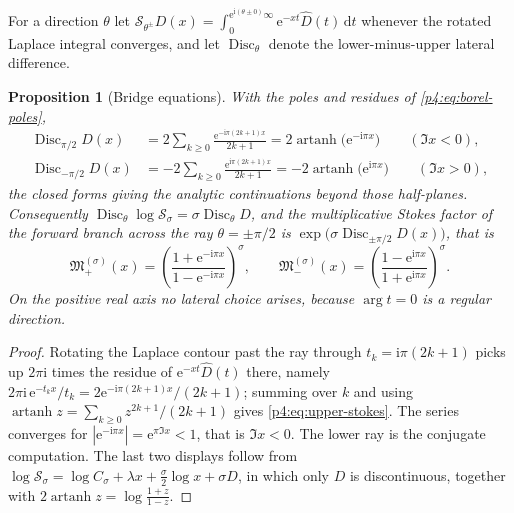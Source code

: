 \documentclass[11pt,a4paper,oneside]{book}
\theoremstyle{plain}
\newtheorem{proposition}[theorem]{Proposition}
\theoremstyle{definition}
\theoremstyle{remark}
\newcommand{\e}{\mathrm{e}}
\newcommand{\ii}{\mathrm{i}}
\newcommand{\dd}{\mathrm{d}}
\begin{document}
For a direction $\theta$ let
$\mathcal S_{\theta^{\pm}}D(x)
 =\int_0^{\e^{\ii(\theta\pm0)}\infty}\e^{-xt}\widehat D(t)\,\dd t$
whenever the rotated Laplace integral converges, and let
$\operatorname{Disc}_\theta$ denote the lower-minus-upper lateral difference.

\begin{proposition}[Bridge equations]
\label{p4:prop:stokes}
With the poles and residues of \cref{p4:eq:borel-poles},
\begin{align}
  \operatorname{Disc}_{\pi/2}D(x)
   &=2\sum_{k\ge0}\frac{\e^{-\ii\pi(2k+1)x}}{2k+1}
   =2\operatorname{artanh}\bigl(\e^{-\ii\pi x}\bigr)
   \qquad(\Im x<0),
  \label{p4:eq:upper-stokes}\\
  \operatorname{Disc}_{-\pi/2}D(x)
   &=-2\sum_{k\ge0}\frac{\e^{\ii\pi(2k+1)x}}{2k+1}
   =-2\operatorname{artanh}\bigl(\e^{\ii\pi x}\bigr)
   \qquad(\Im x>0),
  \label{p4:eq:lower-stokes}
\end{align}
the closed forms giving the analytic continuations beyond those half-planes.
Consequently
$\operatorname{Disc}_\theta\log\mathcal S_\sigma
 =\sigma\operatorname{Disc}_\theta D$, and the multiplicative Stokes factor of
the forward branch across the ray $\theta=\pm\pi/2$ is
$\exp\bigl(\sigma\operatorname{Disc}_{\pm\pi/2}D(x)\bigr)$, that is
\begin{equation}
  \mathfrak M^{(\sigma)}_{+}(x)
   =\left(\frac{1+\e^{-\ii\pi x}}{1-\e^{-\ii\pi x}}\right)^{\!\sigma},
  \qquad
  \mathfrak M^{(\sigma)}_{-}(x)
   =\left(\frac{1-\e^{\ii\pi x}}{1+\e^{\ii\pi x}}\right)^{\!\sigma}.
  \label{p4:eq:stokes-multipliers}
\end{equation}
On the positive real axis no lateral choice arises, because $\arg t=0$ is a
regular direction.
\end{proposition}

\begin{proof}
Rotating the Laplace contour past the ray through $t_k=\ii\pi(2k+1)$ picks up
$2\pi\ii$ times the residue of $\e^{-xt}\widehat D(t)$ there, namely
$2\pi\ii\,\e^{-t_kx}/t_k=2\e^{-\ii\pi(2k+1)x}/(2k+1)$; summing over $k$ and
using $\operatorname{artanh}z=\sum_{k\ge0}z^{2k+1}/(2k+1)$ gives
\cref{p4:eq:upper-stokes}.  The series converges for
$|\e^{-\ii\pi x}|=\e^{\pi\Im x}<1$, that is $\Im x<0$.  The lower ray is the
conjugate computation.  The last two displays follow from
$\log\mathcal S_\sigma=\log C_\sigma+\lambda x+\tfrac\sigma2\log x+\sigma D$,
in which only $D$ is discontinuous, together with
$2\operatorname{artanh}z=\log\frac{1+z}{1-z}$.
\end{proof}
\end{document}
